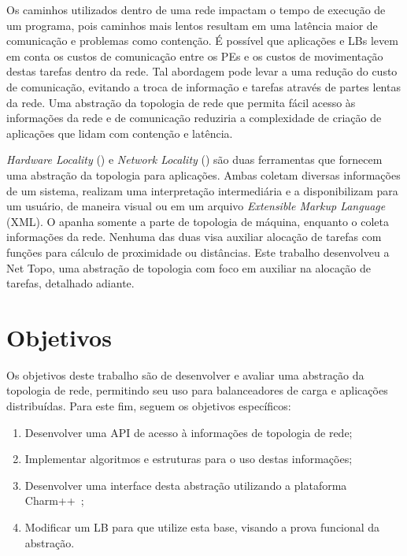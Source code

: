 Os caminhos utilizados dentro de uma rede impactam o tempo de execução de um programa, pois caminhos mais lentos resultam em uma latência maior de comunicação e problemas como contenção. É possível que aplicações e LBs levem em conta os custos de comunicação entre os PEs e os custos de movimentação destas tarefas dentro da rede. Tal abordagem pode levar a uma redução do custo de comunicação, evitando a troca de informação e tarefas através de partes lentas da rede. Uma abstração da topologia de rede que permita fácil acesso às informações da rede e de comunicação reduziria a complexidade de criação de aplicações que lidam com contenção e latência.

\textit{Hardware Locality} (\hwloc) e \textit{Network Locality} (\netloc) são duas ferramentas que fornecem uma abstração da topologia para aplicações.
Ambas coletam diversas informações de um sistema, realizam uma interpretação intermediária e a disponibilizam para um usuário, de maneira visual ou em um arquivo \textit{Extensible Markup Language} (XML).
O \hwloc apanha somente a parte de topologia de máquina, enquanto o \netloc coleta informações da rede.
Nenhuma das duas visa auxiliar alocação de tarefas com funções para cálculo de proximidade ou distâncias.
Este trabalho desenvolveu a Net Topo, uma abstração de topologia com foco em auxiliar na alocação de tarefas, detalhado adiante.

\section{Objetivos}
\label{sec:objetivos}

Os objetivos deste trabalho são de desenvolver e avaliar uma abstração da topologia de rede, permitindo seu uso para balanceadores de carga e aplicações distribuídas. Para este fim, seguem os objetivos específicos:

\begin{enumerate}
\item Desenvolver uma API de acesso à informações de topologia de rede;
\item Implementar algoritmos e estruturas para o uso destas informações;
\item Desenvolver uma interface desta abstração utilizando a plataforma Charm++~\cite{website:CHARM};
\item Modificar um LB para que utilize esta base, visando a prova funcional da abstração.

\end{enumerate}

